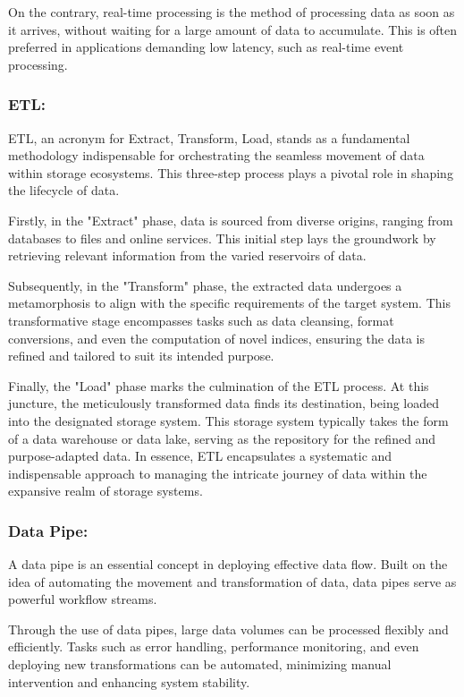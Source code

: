 On the contrary, real-time processing is the method of processing data as soon
as it arrives, without waiting for a large amount of data to accumulate. This is
often preferred in applications demanding low latency, such as real-time event
processing.

\subsubsection*{ETL:}

ETL, an acronym for Extract, Transform, Load, stands as a fundamental
methodology indispensable for orchestrating the seamless movement of data within
storage ecosystems. This three-step process plays a pivotal role in shaping the
lifecycle of data.

Firstly, in the "Extract" phase, data is sourced from diverse origins, ranging
from databases to files and online services. This initial step lays the
groundwork by retrieving relevant information from the varied reservoirs of
data.

Subsequently, in the "Transform" phase, the extracted data undergoes a
metamorphosis to align with the specific requirements of the target system. This
transformative stage encompasses tasks such as data cleansing, format
conversions, and even the computation of novel indices, ensuring the data is
refined and tailored to suit its intended purpose.

Finally, the "Load" phase marks the culmination of the ETL process. At this
juncture, the meticulously transformed data finds its destination, being loaded
into the designated storage system. This storage system typically takes the form
of a data warehouse or data lake, serving as the repository for the refined and
purpose-adapted data. In essence, ETL encapsulates a systematic and
indispensable approach to managing the intricate journey of data within the
expansive realm of storage systems.

\subsubsection*{Data Pipe:}

A data pipe is an essential concept in deploying effective data flow. Built on
the idea of automating the movement and transformation of data, data pipes serve
as powerful workflow streams.

Through the use of data pipes, large data volumes can be processed flexibly and
efficiently. Tasks such as error handling, performance monitoring, and even
deploying new transformations can be automated, minimizing manual intervention
and enhancing system stability.


